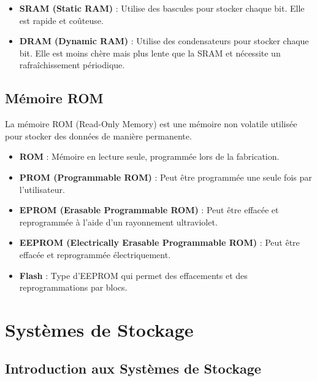 \documentclass[10pt,a4paper]{article}
\begin{document}
\begin{itemize}
    \item \textbf{SRAM (Static RAM)} : Utilise des bascules pour stocker chaque bit. Elle est rapide et coûteuse.
    \item \textbf{DRAM (Dynamic RAM)} : Utilise des condensateurs pour stocker chaque bit. Elle est moins chère mais plus lente que la SRAM et nécessite un rafraîchissement périodique.
\end{itemize}


\subsection*{Mémoire ROM}

La mémoire ROM (Read-Only Memory) est une mémoire non volatile utilisée pour stocker des données de manière permanente.

\begin{itemize}
    \item \textbf{ROM} : Mémoire en lecture seule, programmée lors de la fabrication.
    \item \textbf{PROM (Programmable ROM)} : Peut être programmée une seule fois par l'utilisateur.
    \item \textbf{EPROM (Erasable Programmable ROM)} : Peut être effacée et reprogrammée à l'aide d'un rayonnement ultraviolet.
    \item \textbf{EEPROM (Electrically Erasable Programmable ROM)} : Peut être effacée et reprogrammée électriquement.
    \item \textbf{Flash} : Type d'EEPROM qui permet des effacements et des reprogrammations par blocs.
\end{itemize}


\section*{Systèmes de Stockage}

\subsection*{Introduction aux Systèmes de Stockage}
\end{document}
